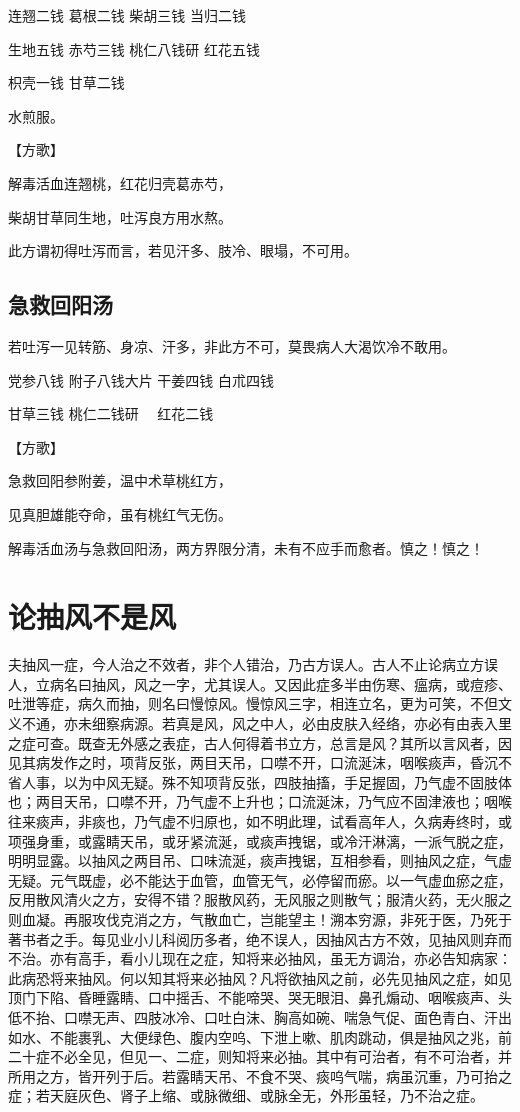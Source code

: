 \documentclass[a4paper,12pt,UTF8,twoside]{ctexbook}
\begin{document}
	
	连翘二钱 葛根二钱 柴胡三钱 当归二钱
	
	生地五钱 赤芍三钱 桃仁八钱研 红花五钱
	
	枳壳一钱 甘草二钱
	
	水煎服。
	
	【方歌】
	
	解毒活血连翘桃，红花归壳葛赤芍，
	
	柴胡甘草同生地，吐泻良方用水熬。
	
	此方谓初得吐泻而言，若见汗多、肢冷、眼塌，不可用。
	
	\section{急救回阳汤}
	
	
	若吐泻一见转筋、身凉、汗多，非此方不可，莫畏病人大渴饮冷不敢用。
	
	党参八钱 附子八钱大片 干姜四钱 白朮四钱
	
	甘草三钱 桃仁二钱研　 红花二钱
	
	【方歌】
	
	急救回阳参附姜，温中术草桃红方，
	
	见真胆雄能夺命，虽有桃红气无伤。
	
	解毒活血汤与急救回阳汤，两方界限分清，未有不应手而愈者。慎之！慎之！
	
	\chapter{论抽风不是风}
	夫抽风一症，今人治之不效者，非个人错治，乃古方误人。古人不止论病立方误人，立病名曰抽风，风之一字，尤其误人。又因此症多半由伤寒、瘟病，或痘疹、吐泄等症，病久而抽，则名曰慢惊风。慢惊风三字，相连立名，更为可笑，不但文义不通，亦未细察病源。若真是风，风之中人，必由皮肤入经络，亦必有由表入里之症可查。既查无外感之表症，古人何得着书立方，总言是风？其所以言风者，因见其病发作之时，项背反张，两目天吊，口噤不开，口流涎沫，咽喉痰声，昏沉不省人事，以为中风无疑。殊不知项背反张，四肢抽搐，手足握固，乃气虚不固肢体也；两目天吊，口噤不开，乃气虚不上升也；口流涎沫，乃气应不固津液也；咽喉往来痰声，非痰也，乃气虚不归原也，如不明此理，试看高年人，久病寿终时，或项强身重，或露睛天吊，或牙紧流涎，或痰声拽锯，或冷汗淋漓，一派气脱之症，明明显露。以抽风之两目吊、口味流涎，痰声拽锯，互相参看，则抽风之症，气虚无疑。元气既虚，必不能达于血管，血管无气，必停留而瘀。以一气虚血瘀之症，反用散风清火之方，安得不错？服散风药，无风服之则散气；服清火药，无火服之则血凝。再服攻伐克消之方，气散血亡，岂能望主！溯本穷源，非死于医，乃死于著书者之手。每见业小儿科阅历多者，绝不误人，因抽风古方不效，见抽风则弃而不治。亦有高手，看小儿现在之症，知将来必抽风，虽无方调治，亦必告知病家：此病恐将来抽风。何以知其将来必抽风？凡将欲抽风之前，必先见抽风之症，如见顶门下陷、昏睡露睛、口中摇舌、不能啼哭、哭无眼泪、鼻孔煽动、咽喉痰声、头低不抬、口噤无声、四肢冰冷、口吐白沫、胸高如碗、喘急气促、面色青白、汗出如水、不能裹乳、大便绿色、腹内空呜、下泄上嗽、肌肉跳动，俱是抽风之兆，前二十症不必全见，但见一、二症，则知将来必抽。其中有可治者，有不可治者，并所用之方，皆开列于后。若露睛天吊、不食不哭、痰呜气喘，病虽沉重，乃可抬之症；若天庭灰色、肾子上缩、或脉微细、或脉全无，外形虽轻，乃不治之症。
\end{document}
